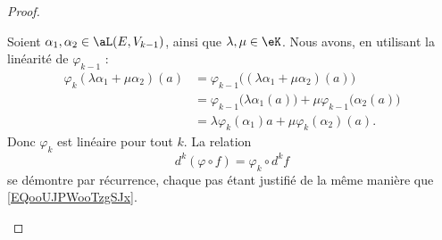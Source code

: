 \begin{proof}
	\begin{subproof}
		Soient \( \alpha_1,\alpha_2\in \aL(E,V_{k-1})\), ainsi que \( \lambda,\mu\in \eK\). Nous avons, en utilisant la linéarité de \( \varphi_{k-1}\) :
		\begin{subequations}
			\begin{align}
				\varphi_k(\lambda\alpha_1+\mu\alpha_2)(a) & =\varphi_{k-1}\big( (\lambda\alpha_1+\mu\alpha_2)(a) \big)                          \\
				                                          & =\varphi_{k-1}\big(\lambda \alpha_1(a)\big)+\mu\varphi_{k-1}\big( \alpha_2(a) \big) \\
				                                          & =\lambda\varphi_k(\alpha_1)a+\mu\varphi_k(\alpha_2)(a).
			\end{align}
		\end{subequations}
		Donc \( \varphi_k\) est linéaire pour tout \( k\).
		\spitem[La relation]
		La relation
		\begin{equation}
			d^k(\varphi\circ f)=\varphi_k\circ d^kf
		\end{equation}
		se démontre par récurrence, chaque pas étant justifié de la même manière que \eqref{EQooUJPWooTzgSJx}.
	\end{subproof}
\end{proof}

